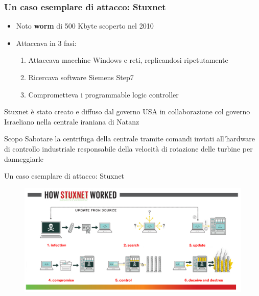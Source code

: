 
\begin{frame}
  \frametitle{Un caso esemplare di attacco: Stuxnet}
  \begin{itemize}[<+- | alert@+>]
  	\item Noto \textbf{\color{blue_slides}worm} di 500 Kbyte scoperto nel 2010 %
  	\item Attaccava in 3 fasi:
  	\begin{enumerate}[<+- | alert@+>]
  		\item Attaccava macchine Windows e reti, replicandosi ripetutamente
  		\item Ricercava software Siemens Step7 %
  		\item Comprometteva i programmable logic controller
  	\end{enumerate}
  \end{itemize}
  \pause
  \begin{block}{}
  Stuxnet è stato creato e diffuso dal governo USA in collaborazione col governo Israeliano nella centrale iraniana di Natanz
  \end{block}
  \pause
   \begin{block}{Scopo}
   	Sabotare la centrifuga della centrale tramite comandi inviati all’hardware di controllo industriale responsabile della velocità di rotazione delle turbine per danneggiarle
   \end{block}
\end{frame}

\begin{frame}{Un caso esemplare di attacco: Stuxnet}
	\begin{figure}[h] 
		\includegraphics[scale=0.3,cfbox=blue_slides 1pt 0pt]{imgs/stuxnet_hsw.png}
	\end{figure}
\end{frame}

